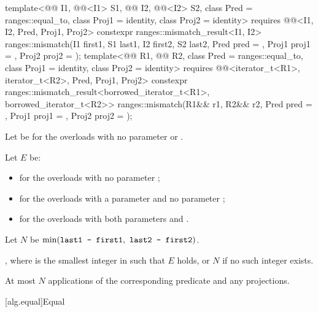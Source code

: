 \begin{itemdecl}
template<@@ I1, @@<I1> S1, @@ I2, @@<I2> S2,
         class Pred = ranges::equal_to, class Proj1 = identity, class Proj2 = identity>
  requires @@<I1, I2, Pred, Proj1, Proj2>
  constexpr ranges::mismatch_result<I1, I2>
    ranges::mismatch(I1 first1, S1 last1, I2 first2, S2 last2, Pred pred = {},
                     Proj1 proj1 = {}, Proj2 proj2 = {});
template<@@ R1, @@ R2,
         class Pred = ranges::equal_to, class Proj1 = identity, class Proj2 = identity>
  requires @@<iterator_t<R1>, iterator_t<R2>, Pred, Proj1, Proj2>
  constexpr ranges::mismatch_result<borrowed_iterator_t<R1>, borrowed_iterator_t<R2>>
    ranges::mismatch(R1&& r1, R2&& r2, Pred pred = {},
                     Proj1 proj1 = {}, Proj2 proj2 = {});
\end{itemdecl}

\begin{itemdescr}
\pnum
Let  be 
for the overloads with no parameter  or .

\pnum
Let $E$ be:
\begin{itemize}
\setlength{\emergencystretch}{1em}
\item
  for the overloads with no parameter ;
\item
  for the overloads with a parameter  and
  no parameter ;
\item
  for the overloads with both parameters  and .
\end{itemize}

\pnum
Let $N$ be $\min(\tcode{last1 - first1}, \ \tcode{last2 - first2})$.

\pnum
\returns
{},
where  is the smallest integer in  such that $E$ holds,
or $N$ if no such integer exists.

\pnum
\complexity
At most $N$ applications of the corresponding predicate and any projections.
\end{itemdescr}

[alg.equal]{Equal}

